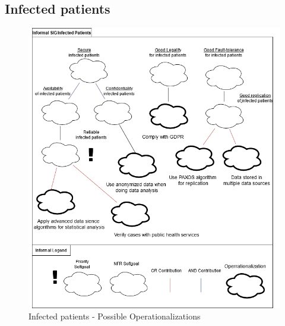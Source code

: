 \documentclass{VUMIFPSkursinis}
\begin{document}
\begin{landscape}
	\subsection{Infected patients}
		\begin{figure}[H]
			\center
			\includegraphics[scale=0.5]{img/Infected-Patients-3}
			\caption{Infected patients - Possible Operationalizations} %
			\label{img:kurimoProcesas}
		\end{figure}


\end{landscape}
\end{document}
